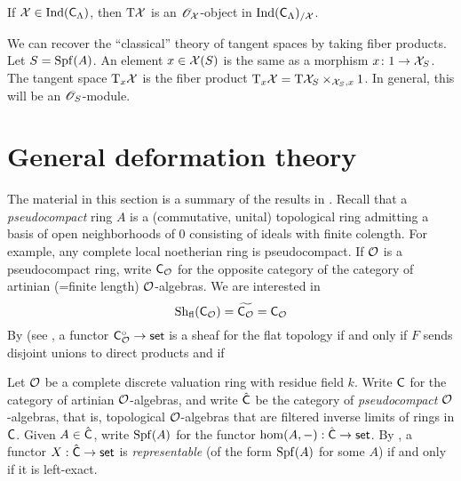 \documentclass[phd,cornellheadings,draft]{cornell}
\begin{document}
\begin{theorem}
If $\mathcal{X}\in \operatorname{Ind}(\mathsf{C}_\Lambda)$, then $\mathrm{T}\mathcal{X}$ is an 
$\mathscr{O}_{\mathcal{X}}$-object in $\operatorname{Ind}(\mathsf{C}_\Lambda)_{/\mathcal{X}}$. 
\end{theorem}

We can recover the ``classical'' theory of tangent spaces by taking fiber 
products. Let $S=\operatorname{Spf}(A)$. An element $x\in \mathcal{X}(S)$ is the same as 
a morphism $x\colon 1\to \mathcal{X}_S$. The tangent space $\mathrm{T}_x \mathcal{X}$ is the fiber 
product $\mathrm{T}_x \mathcal{X} = \mathrm{T} \mathcal{X}_S\times_{\mathcal{X}_S,x} 1$. In general, this 
will be an $\mathscr{O}_S$-module. 



\section{General deformation theory}

The material in this section is a summary of the results in 
\cite[7\textsubscript{b} \S0--2]{sga3-i}. Recall that a \emph{pseudocompact} 
ring $A$ is a (commutative, unital) topological ring admitting a basis of 
open neighborhoods of $0$ consisting of ideals with finite colength. For 
example, any complete local noetherian ring is pseudocompact. If 
$\mathcal{O}$ is a pseudocompact ring, write $\mathsf{C}_{\mathcal{O}}$ for the opposite category 
of the category of artinian (=finite length) $\mathcal{O}$-algebras. We are interested 
in 
\[
  \mathrm{Sh}_\mathrm{fl}(\mathsf{C}_{\mathcal{O}}) = \widetilde{\mathsf{C}_{\mathcal{O}}} = \mathsf{C}_{\mathcal{O}}
\]
By \cite[IV 4.3.5]{sga3-i} (see \cite[VII\textsubscript{B} 1.5]{sga3-i}, a 
functor $\mathsf{C}_{\mathcal{O}}^\circ\to\mathsf{set}$ is a sheaf for the flat topology if and 
only if $F$ sends disjoint unions to direct products and if 

Let $\mathcal{O}$ be a complete discrete valuation ring with residue field $k$. Write 
$\mathsf{C}$ for the category of artinian $\mathcal{O}$-algebras, and write 
$\hat{\mathsf{C}}$ be the category of \emph{pseudocompact} $\mathcal{O}$-algebras, that is, 
topological $\mathcal{O}$-algebras that are filtered inverse limits of rings in 
$\mathsf{C}$. Given $A\in \hat{\mathsf{C}}$, write $\operatorname{Spf}(A)$ for the 
functor $\hom(A,-):\hat{\mathsf{C}}\to \mathsf{set}$. By 
\cite[$\mathrm{VII_B}$ \S 0.4]{sga3-i}, a functor $X:\hat{\mathsf{C}}\to \mathsf{set}$ is 
\emph{representable} (of the form $\operatorname{Spf}(A)$ for some $A$) if and 
only if it is left-exact. 
\end{document}
